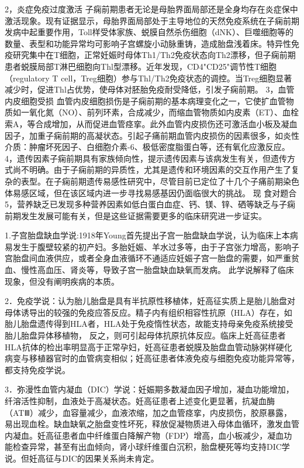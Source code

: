 2，炎症免疫过度激活 子痫前期患者无论是母胎界面局部还是全身均存在炎症保中激活现象。现有证据显示，母胎界面局部处于主导地位的天然免疫系统在子痫前期发病中起重要作用，Toll样受体家族、蜕膜自然杀伤细胞（dNK）、巨噬细胞等的数量、表型和功能异常均可影响子宫螺旋小动脉重铸，造成胎盘浅着床。特异性免疫研究集中在T细胞，正常妊娠时母体Th1/Th2免疫状态向Th2漂移，但子痫前期患者蜕膜局部T淋巴细胞向Thl型漂移。近年发现，CD4"CD25"调节性T细胞（regulatory T cell，Treg细胞）参与Thl/Th2免疫状态的调控。当Treg细胞显著减少时，促进Thl占优势，使母体对胚胎免疫耐受降低，引发子痫前期。
3，血管内皮细胞受损 血管内皮细胞损伤是子痫前期的基本病理变化之一，它使扩血管物质如一氧化氮（NO）、前列环素，合成减少，而缩血管物质如内皮素（ET）、血栓索A，等合成增加，从而促进血管痉挛。此外血管内皮损伤还可激活血小板及凝血因子，加重子痫前期的高凝状态。引起子痛前期血管内皮损伤的因素很多，如炎性介质：肿瘤坏死因子、白细胞介素-6、极低密度脂蛋白等，还有氧化应激反应。
4，遗传因素子痫前期具有家族倾向性，提示遗传因素与该病发生有关，但遗传方式尚不明确。由于子痫前期的异质性，尤其是遗传和环境因素的交互作用产生了复杂的表型。在子痫前期遗传易感性研究中，尽管目前已定位了十几个子痛前期染色体易感区域，但在该区域内进一步寻找易感基因仍面临很大的挑战。
现 食对题合
5，营养缺乏已发现多种营养因素如低白蛋白血症、钙、镁、锌、硒等缺乏与子痫前期发生发展可能有关，但是这些证据需要更多的临床研究进一步证实。

1.子宫胎盘缺血学说:1918年Young首先提出子宫一胎盘缺血学说，认为临床上本病易发生于腹壁较紧的初产妇。多胎妊娠、羊水过多等，由于子宫张力增高，影响子宫胎盘间血液供应，或者全身血液循环不通适应妊娠子宫一胎盘的需要，如严重贫血、慢性高血压、肾炎等，导致子宫一胎盘缺血缺氧而发病。
此学说解释了临床现象，但没有阐明疾病的本质。

2．免疫学说：认为胎儿胎盘是具有半抗原性移植体，妊高征实质上是胎儿胎盘对母体诱导出的较强的免疫应答反应。精子内有组织相容性抗原（HLA）存在，如胎儿胎盘遗传得到HLA者，HLA处于免疫惰性状态，故能支持母亲免疫系统接受胎儿胎盘异体移植物，
反之，则可引起母体抗原抗体反应。临床上妊高征患者HLA抗体的检出率明显高于正常孕妇，妊高征患者蜕膜及胎盘血管动脉粥样硬化病变与移植器官时的血管病变相似；妊高征患者体液免疫与细胞免疫功能异常等，都支持免疫学说。

3．弥漫性血管内凝血（DIC）学说：妊娠期多数凝血因子增加，凝血功能增加，纤溶活性抑制，血液处于高凝状态。妊高征患者上述变化更显著，抗凝血酶（ATⅢ）减少，血容量减少，血液浓缩，加之血管痉挛，内皮损伤，胶原暴露，易出现血栓。缺血缺氧之胎盘变性坏死，释放促凝物质进入母体血循环，激发血管内凝血。妊高征患者血中纤维蛋白降解产物（FDP）增高，血小板减少，凝血功能检查异常，甚至有出血倾向，肾小球纤维蛋白沉积，胎盘梗死等均支持DIC学说。但妊高征与DIC的因果关系尚未肯定。

